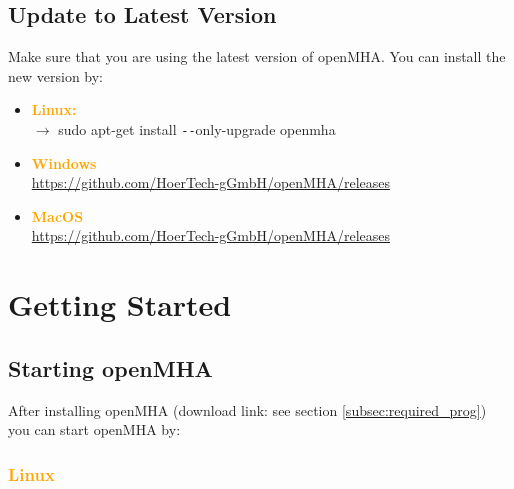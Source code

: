 \documentclass[11pt,a4paper,twoside]{article}
\newcommand{\+}{\discretionary{\mbox{\scriptsize$\hookleftarrow$}}{}{}}
\begin{document}
\newpage

\subsection{Update to Latest Version}


Make sure that you are using the latest version of openMHA. You can install the new version by:

\begin{itemize}
   \item \textcolor{orange}{\textbf{Linux:}} \\
   $\rightarrow$ {\ttfamily sudo apt-get install \texttt{-{}-}only-upgrade openmha} 
   \item \textcolor{orange}{\textbf{Windows}} \\
   \footnotesize{\url{https://github.com/HoerTech-gGmbH/openMHA/releases}}
   \item \textcolor{orange}{\textbf{MacOS}} \\
   \footnotesize{\url{https://github.com/HoerTech-gGmbH/openMHA/releases}}
   \end{itemize}



 




\section{Getting Started}

    \subsection{Starting openMHA}
    \label{starting_openmha}
    
After installing openMHA (download link: see section \ref{subsec:required_prog}) you can start openMHA by: 

\subsubsection*{\textcolor{orange}{\textbf{Linux}}}
\end{document}
